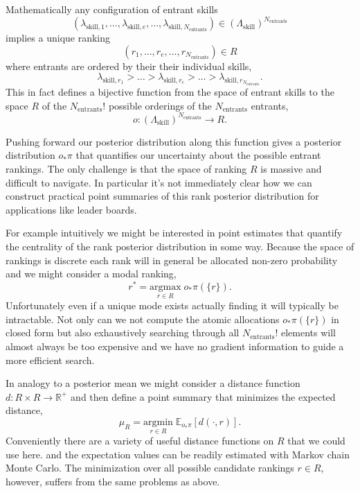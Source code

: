 \documentclass[
  letterpaper,
  DIV=11,
  numbers=noendperiod]{scrartcl}
\begin{document}
Mathematically any configuration of entrant skills \[
( \lambda_{\mathrm{skill}, 1}, \ldots,
  \lambda_{\mathrm{skill}, e}, \ldots,
  \lambda_{\mathrm{skill}, N_{\mathrm{entrants}}} )
\in \left( \Lambda_{\mathrm{skill}} \right)^{N_{\mathrm{entrants}}}
\] implies a unique ranking \[
(r_{1}, \ldots, r_{e}, \ldots, r_{N_{\mathrm{entrants}}}) \in R
\] where entrants are ordered by their their individual skills, \[
\lambda_{\mathrm{skill}, r_{1}} > \ldots >
\lambda_{\mathrm{skill}, r_{e}} > \ldots >
\lambda_{\mathrm{skill}, r_{N_{\mathrm{entrants}}}}.
\] This in fact defines a bijective function from the space of entrant
skills to the space \(R\) of the \(N_{\mathrm{entrants}}!\) possible
orderings of the \(N_{\mathrm{entrants}}\) entrants, \[
o : \left( \Lambda_{\mathrm{skill}} \right)^{N_{\mathrm{entrants}}}
    \rightarrow R.
\]

Pushing forward our posterior distribution along this function gives a
posterior distribution \(o_{*} \pi\) that quantifies our uncertainty
about the possible entrant rankings. The only challenge is that the
space of ranking \(R\) is massive and difficult to navigate. In
particular it's not immediately clear how we can construct practical
point summaries of this rank posterior distribution for applications
like leader boards.

For example intuitively we might be interested in point estimates that
quantify the centrality of the rank posterior distribution in some way.
Because the space of rankings is discrete each rank will in general be
allocated non-zero probability and we might consider a modal ranking, \[
r^{*} = \underset{r \in R}{\mathrm{argmax}} \; o_{*} \pi( \{ r \} ).
\] Unfortunately even if a unique mode exists actually finding it will
typically be intractable. Not only can we not compute the atomic
allocations \(o_{*} \pi( \{ r \} )\) in closed form but also
exhaustively searching through all \(N_{\mathrm{entrants}}!\) elements
will almost always be too expensive and we have no gradient information
to guide a more efficient search.

In analogy to a posterior mean we might consider a distance function
\(d : R \times R \rightarrow \mathbb{R}^{+}\) and then define a point
summary that minimizes the expected distance, \[
\mu_{R}
=
\underset{r \in R}{\mathrm{argmin}} \; \mathbb{E}_{o_{*} \pi}[ d( \cdot, r) ].
\] Conveniently there are a variety of useful distance functions on
\(R\) that we could use here. and the expectation values can be readily
estimated with Markov chain Monte Carlo. The minimization over all
possible candidate rankings \(r \in R\), however, suffers from the same
problems as above.
\end{document}
